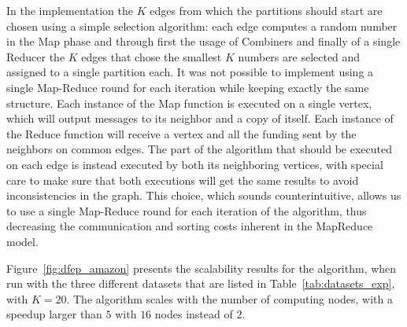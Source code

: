 In the \dfep implementation the $K$ edges from which the partitions should start are 
chosen using a simple selection algorithm: each edge computes a random number in 
the Map phase and through first the usage of Combiners and finally of a single 
Reducer the $K$ edges that chose the smallest $K$ numbers are selected and assigned to 
a single partition each. 
It was not possible to implement \dfep using a single Map-Reduce round for 
each iteration while keeping exactly the same structure. Each instance of the Map 
function is executed on a single vertex, which will output messages to its 
neighbor and a copy of itself. Each instance of the Reduce function will receive 
a vertex and all the funding sent by the neighbors on common edges. The part of 
the algorithm that should be executed on each edge is instead executed by both its 
neighboring vertices, with special care to make sure that both executions will get 
the same results to avoid inconsistencies in the graph. This choice, which sounds 
counterintuitive, allows us to use a single Map-Reduce round for each iteration of the algorithm, 
thus decreasing the communication and sorting costs inherent in the MapReduce model.

Figure~\ref{fig:dfep_amazon} presents the scalability results for the \dfep
algorithm, when run with the three different datasets that are listed in
Table~\ref{tab:datasets_exp}, with $K=20$. The algorithm scales with the number
of computing nodes, with a speedup larger than $5$ with $16$ nodes instead of $2$.

